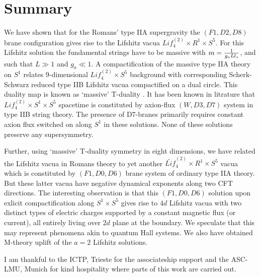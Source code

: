 \documentclass[12pt]{article}
\begin{document}
\section{Summary}

We have shown  
that for the  Romans' type IIA  supergravity  the $(F1,D2,D8)$  brane
 configuration  gives rise to the Lifshitz vacua   
$Lif_4^{(2)}\times {R}^1\times S^5$. For this Lifshitz 
solution  the fundamental  strings have to be  massive with
$m= {1\over g_a L l_s } $, and such that $L\gg 1$ and $g_a \ll 1$.
A compactification of the massive type IIA theory 
on $S^1$ relates  $9$-dimensional  $Lif_4^{(2)}\times S^5$  
background with  corresponding Scherk-Schwarz reduced
type IIB Lifshitz vacua compactified on a dual circle. This duality map is
known as  `massive' T-duality \cite{berg}. It has been known in litrature that
 $Lif_4^{(2)}\times S^1\times S^5$ spacetime 
  is  constituted by axion-flux  $(W,D3,D7)$ system
 in type IIB string theory. 
The presence of D7-branes  primarily requires  constant axion flux
switched on along $S^1$ in these solutions. 
None of these solutions preserve any supersymmetry.


Further,  using  `massive' T-duality symmetry in eight dimensions, 
we have  related the  Lifshitz vacua in Romans theory 
 to yet another  $\widetilde{Lif}_4^{(2)}\times R^1\times S^5$
 vacua which is constituted by  $(F1,D0,D6)$  brane system
of ordinary  type IIA theory. But these latter vacua have  negative 
dynamical exponents along  two  CFT directions. 
The interesting observation is that this $(F1,D0,D6)$ 
solution upon exlicit compactification along $S^1\times S^5$ gives rise to 
$4d$ Lifshitz vacua with two distinct types of electric  charges
supported by a constant magnetic flux (or current), all entirely 
living over $2d$ plane at the boundary. We speculate 
that this may  represent phenomena akin to  quantum Hall systems. 
We also have  obtained  M-theory uplift of the $a=2$
Lifshitz solutions. 



\vskip1cm
 I am thankful to  
the ICTP, Trieste for the associateship support and 
the ASC-LMU, Munich  for kind  hospitality where parts of this work 
are carried out.    


\end{document}
